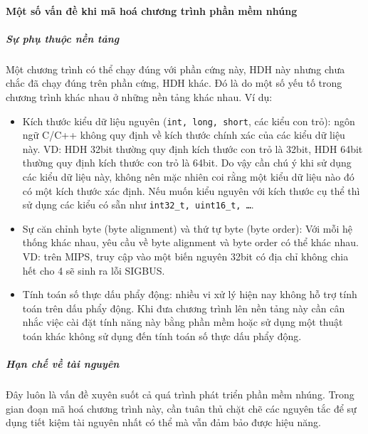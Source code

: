         \paragraph{Một số vấn đề khi mã hoá chương trình phần mềm nhúng}
            \subparagraph{Sự phụ thuộc nền tảng}
                Một chương trình có thể chạy đúng với phần cứng này, HDH này
                nhưng chưa chắc đã chạy đúng trên phần cứng, HDH khác. Đó là do
                một số yếu tố trong chương trình khác nhau ở những nền tảng
                khác nhau. Ví dụ:
                \begin{itemize}
                    \item Kích thước kiểu dữ liệu nguyên (\texttt{int, long,
                        short}, các
                        kiểu con trỏ): ngôn ngữ C/C++ không quy định về kích
                        thước chính xác của các kiểu dữ liệu này. VD: HDH 32bit
                        thường quy định kích thước con trỏ là 32bit, HDH 64bit
                        thường quy định kích thước con trỏ là 64bit. Do vậy cần
                        chú ý khi sử dụng các kiểu dữ liệu này, không nên mặc
                        nhiên coi rằng một kiểu dữ liệu nào đó có một kích
                        thước xác định. Nếu muốn kiểu nguyên với kích thước cụ
                        thể thì sử dụng các kiểu có sẵn như \texttt{int32\_t,
                        uint16\_t, \ldots}.
                    \item Sự căn chỉnh byte (byte alignment) và thứ tự byte
                        (byte order): Với mỗi hệ thống khác nhau, yêu cầu về
                        byte alignment và byte order có thể khác nhau. VD: trên
                        MIPS, truy cập vào một biến nguyên 32bit có địa chỉ
                        không chia hết cho 4 sẽ sinh ra lỗi SIGBUS.
                    \item Tính toán số thực dấu phẩy động: nhiều vi xử lý hiện nay
                        không hỗ trợ tính toán trên dấu phẩy động. Khi đưa
                        chương trình lên nền tảng này cần cân nhắc việc cài đặt
                        tính năng này bằng phần mềm hoặc sử dụng một thuật toán
                        khác không sử dụng đến tính toán số thực dấu phẩy động.
                \end{itemize}
            \subparagraph{Hạn chế về tài nguyên}
                Đây luôn là vấn đề xuyên suốt cả quá trình phát triển phần mềm
                nhúng. Trong gian đoạn mã hoá chương trình này, cần tuân thủ
                chặt chẽ các nguyên tắc để sự dụng tiết kiệm tài nguyên nhất có
                thể mà vẫn đảm bảo được hiệu năng.

